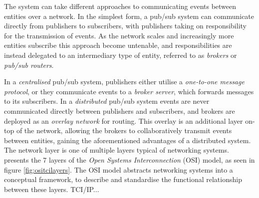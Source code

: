 \documentclass[../report.tex]{subfiles}
\begin{document}
The system can take different approaches to communicating events between entities over a network. In the simplest form, a pub/sub system can communicate directly from publishers to subscribers, with publishers taking on responsibility for the transmission of events. As the network scales and increasingly more entities subscribe this approach become untenable, and responsibilities are instead delegated to an intermediary type of entity, referred to as \textit{brokers} or \textit{pub/sub routers}.

In a \textit{centralised} pub/sub system, publishers either utilise a \textit{one-to-one message protocol}, or they communicate events to a \textit{broker server}, which forwards messages to its subscribers. In a \textit{distributed} pub/sub system events are never communicated directly between publishers and subscribers, and brokers are deployed as an \textit{overlay network} for routing. This overlay is an additional layer on-top of the network, allowing the brokers to collaboratively transmit events between entities, gaining the aforementioned advantages of a distributed system. \\

The network layer is one of multiple layers typical of networking systems. \cite{alani2014guide} presents the 7 layers of the \textit{Open Systems Interconnection} (OSI) model, as seen in figure \ref{fig:ositcilayers}. The OSI model abstracts networking systems into a conceptual framework, to describe and standardise the functional relationship between these layers. TCI/IP... \\
\end{document}
